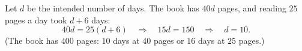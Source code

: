 Let $d$ be the intended number of days. The book has $40d$ pages, and reading $25$ pages a day took $d+6$ days:
\[
40d=25(d+6)\quad\Longrightarrow\quad15d=150\quad\Longrightarrow\quad d=\boxed{10}.
\]
(The book has $400$ pages: $10$ days at $40$ pages or $16$ days at $25$ pages.)
